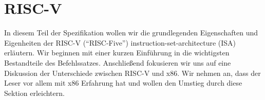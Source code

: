 \chapter{RISC-V}

In diesem Teil der Spezifikation wollen wir die grundlegenden Eigenschaften und
Eigenheiten der RISC-V (``RISC-Five'') instruction-set-architecture (ISA)
erläutern. Wir beginnen mit einer kurzen Einführung in die wichtigsten
Bestandteile des Befehlssatzes. Anschließend fokusieren wir uns auf eine
Diskussion der Unterschiede zwischen RISC-V und x86. Wir nehmen an, dass der
Leser vor allem mit x86 Erfahrung hat und wollen den Umstieg durch diese Sektion
erleichtern.


